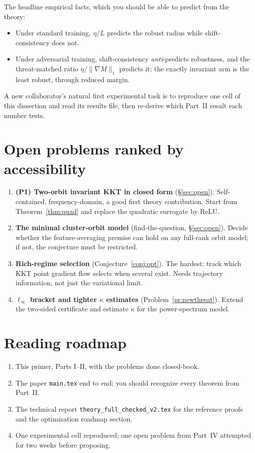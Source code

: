 \documentclass[11pt]{article}
\theoremstyle{plain}
\theoremstyle{definition}
\theoremstyle{remark}
\begin{document}
The headline empirical facts, which you should be able to predict from the theory:
\begin{itemize}[leftmargin=1.4em,nosep]
\item Under standard training, $\eta/L$ predicts the robust radius while shift-consistency does not.
\item Under adversarial training, shift-consistency \emph{anti}-predicts robustness, and the threat-matched ratio
$\eta/\|\nabla M\|_1$ predicts it; the exactly invariant arm is the least robust, through reduced margin.
\end{itemize}
A new collaborator's natural first experimental task is to reproduce one cell of this dissection and read its results
file, then re-derive which Part~II result each number tests.

\section{Open problems ranked by accessibility}
\begin{enumerate}[leftmargin=1.6em]
\item \textbf{(P1) Two-orbit invariant KKT in closed form} (\S\ref{sec:open}). Self-contained, frequency-domain,
a good first theory contribution. Start from Theorem~\ref{thm:quad} and replace the quadratic surrogate by ReLU.
\item \textbf{The minimal cluster-orbit model} (find-the-question, \S\ref{sec:open}). Decide whether the
feature-averaging premise can hold on any full-rank orbit model; if not, the conjecture must be restricted.
\item \textbf{Rich-regime selection} (Conjecture~\ref{conj:opt}). The hardest: track which KKT point gradient flow
selects when several exist. Needs trajectory information, not just the variational limit.
\item \textbf{$\ell_\infty$ bracket and tighter $\kappa$ estimates} (Problem~\ref{pr:newthreat}). Extend the
two-sided certificate and estimate $\kappa$ for the power-spectrum model.
\end{enumerate}

\section{Reading roadmap}
\begin{enumerate}[leftmargin=1.6em,nosep]
\item This primer, Parts I--II, with the problems done closed-book.
\item The paper \texttt{main.tex} end to end; you should recognize every theorem from Part~II.
\item The technical report \texttt{theory\_full\_checked\_v2.tex} for the reference proofs and the optimization
roadmap section.
\item One experimental cell reproduced; one open problem from Part~IV attempted for two weeks before proposing.
\end{enumerate}
\end{document}
